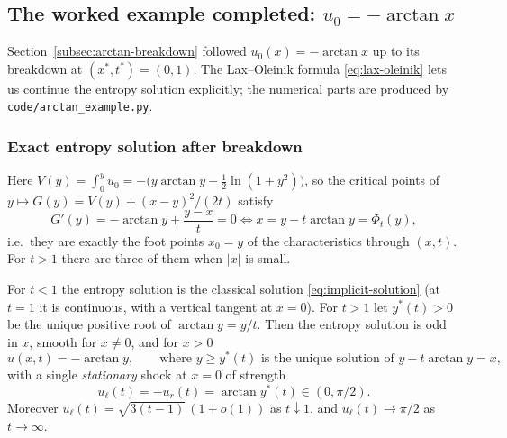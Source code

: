 
\subsection{The worked example completed: $u_0=-\arctan x$}
\label{subsec:arctan-complete}

Section~\ref{subsec:arctan-breakdown} followed
$u_0(x)=-\arctan x$ up to its breakdown at $(x^*,t^*)=(0,1)$. The
Lax--Oleinik formula \eqref{eq:lax-oleinik} lets us continue the entropy
solution explicitly; the numerical parts are produced by
\texttt{code/arctan\_example.py}.

\subsubsection{Exact entropy solution after breakdown}

Here $V(y)=\int_0^y u_0=-\big(y\arctan y-\tfrac12\ln(1+y^2)\big)$, so the
critical points of $y\mapsto G(y)=V(y)+(x-y)^2/(2t)$ satisfy
\begin{equation}
  \label{eq:arctan-critical}
  G'(y)=-\arctan y+\frac{y-x}{t}=0
  \iff x=y-t\arctan y=\Phi_t(y),
\end{equation}
i.e.\ they are exactly the foot points $x_0=y$ of the characteristics
through $(x,t)$. For $t>1$ there are three of them when $|x|$ is small.

\begin{proposition}[Entropy solution for $u_0=-\arctan x$]
\label{prop:arctan-solution}
For $t<1$ the entropy solution is the classical solution
\eqref{eq:implicit-solution} (at $t=1$ it is continuous, with a vertical
tangent at $x=0$). For $t>1$ let $y^*(t)>0$ be the unique
positive root of $\arctan y=y/t$. Then the entropy solution is odd in $x$,
smooth for $x\ne0$, and for $x>0$
\begin{equation}
  \label{eq:arctan-outer}
  u(x,t)=-\arctan y,\qquad\text{where } y\ge y^*(t)\text{ is the unique solution of }
  y-t\arctan y=x,
\end{equation}
with a single \emph{stationary} shock at $x=0$ of strength
\begin{equation}
  \label{eq:arctan-strength}
  u_\ell(t)=-u_r(t)=\arctan y^*(t)\in(0,\pi/2).
\end{equation}
Moreover $u_\ell(t)=\sqrt{3(t-1)}\,(1+o(1))$ as $t\downarrow1$, and
$u_\ell(t)\to\pi/2$ as $t\to\infty$.
\end{proposition}

